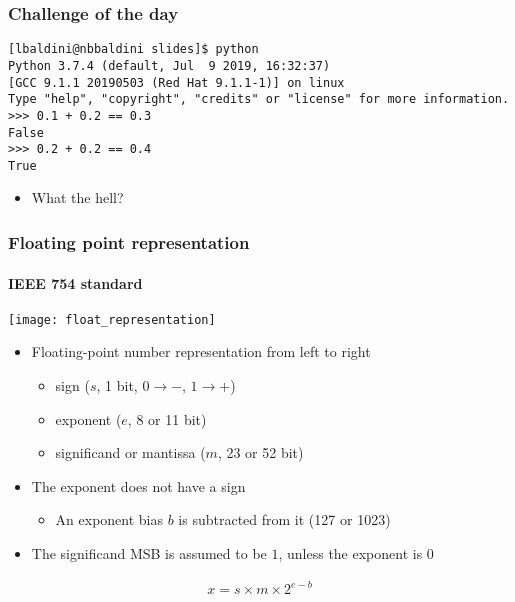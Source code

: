 \documentclass[9pt]{beamer}
\begin{document}
\begin{frame}[fragile]
  \frametitle{Challenge of the day}
  \begin{Verbatim}
[lbaldini@nbbaldini slides]$ python
Python 3.7.4 (default, Jul  9 2019, 16:32:37) 
[GCC 9.1.1 20190503 (Red Hat 9.1.1-1)] on linux
Type "help", "copyright", "credits" or "license" for more information.
>>> 0.1 + 0.2 == 0.3
False
>>> 0.2 + 0.2 == 0.4
True
  \end{Verbatim}

  \bigskip
  
  \begin{itemize}
  \item \alert{What the hell?}
  \end{itemize}
\end{frame}


\begin{frame}
  \frametitle{Floating point representation}
  \framesubtitle{IEEE 754 standard}
  \centering\texttt{[image: float\_representation]}

  \bigskip
  
  \begin{itemize}
  \item Floating-point number representation from left to right
    \begin{itemize}
    \item \alert{sign} ($s$, 1 bit, $0 \rightarrow -$, $1 \rightarrow +$)
    \item \alert{exponent} ($e$, 8 or 11 bit)
    \item \alert{significand} or \alert{mantissa} ($m$, 23 or 52 bit)
    \end{itemize}
  \item The exponent does not have a sign
    \begin{itemize}
    \item An exponent bias $b$ is subtracted from it (127 or 1023)
    \end{itemize}
  \item The significand MSB is assumed to be $1$, unless the exponent is 0
  \end{itemize}

  \begin{align}
    x = s \times m \times 2^{e - b}
  \end{align}
\end{frame}
\end{document}
